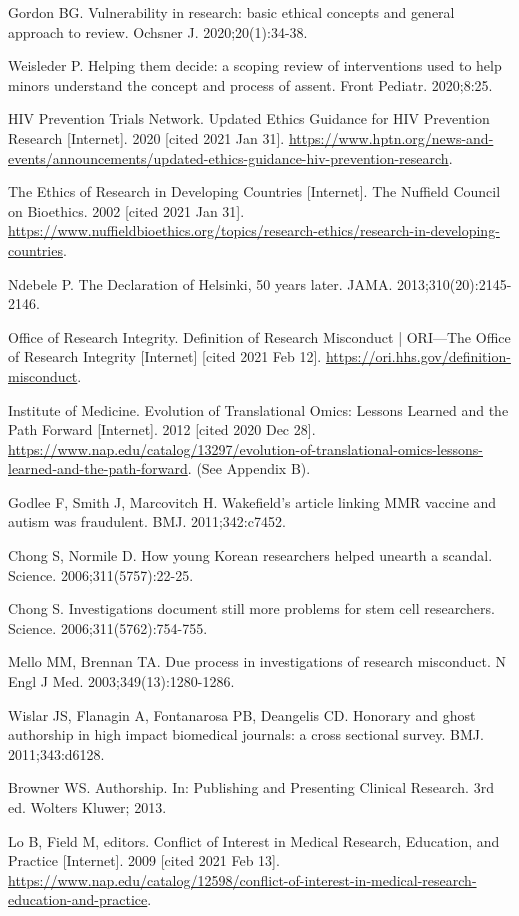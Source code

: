 \begin{references}
\item Gordon BG. Vulnerability in research: basic ethical concepts and general approach to review. Ochsner J. 2020;20(1):34-38.
\item Weisleder P. Helping them decide: a scoping review of interventions used to help minors understand the concept and process of assent. Front Pediatr. 2020;8:25.
\item HIV Prevention Trials Network. Updated Ethics Guidance for HIV Prevention Research [Internet]. 2020 [cited 2021 Jan 31]. \url{https://www.hptn.org/news-and-events/announcements/updated-ethics-guidance-hiv-prevention-research}.
\item The Ethics of Research in Developing Countries [Internet]. The Nuffield Council on Bioethics. 2002 [cited 2021 Jan 31]. \url{https://www.nuffieldbioethics.org/topics/research-ethics/research-in-developing-countries}.
\item Ndebele P. The Declaration of Helsinki, 50 years later. JAMA. 2013;310(20):2145-2146.
\item Office of Research Integrity. Definition of Research Misconduct | ORI—The Office of Research Integrity [Internet] [cited 2021 Feb 12]. \url{https://ori.hhs.gov/definition-misconduct}.
\item Institute of Medicine. Evolution of Translational Omics: Lessons Learned and the Path Forward [Internet]. 2012 [cited 2020 Dec 28]. \url{https://www.nap.edu/catalog/13297/evolution-of-translational-omics-lessons-learned-and-the-path-forward}. (See Appendix B).
\item Godlee F, Smith J, Marcovitch H. Wakefield’s article linking MMR vaccine and autism was fraudulent. BMJ. 2011;342:c7452.
\item Chong S, Normile D. How young Korean researchers helped unearth a scandal. Science. 2006;311(5757):22-25.
\item Chong S. Investigations document still more problems for stem cell researchers. Science. 2006;311(5762):754-755.
\item Mello MM, Brennan TA. Due process in investigations of research misconduct. N Engl J Med. 2003;349(13):1280-1286.
\item Wislar JS, Flanagin A, Fontanarosa PB, Deangelis CD. Honorary and ghost authorship in high impact biomedical journals: a cross sectional survey. BMJ. 2011;343:d6128.
\item Browner WS. Authorship. In: Publishing and Presenting Clinical Research. 3rd ed. Wolters Kluwer; 2013.
\item Lo B, Field M, editors. Conflict of Interest in Medical Research, Education, and Practice [Internet]. 2009 [cited 2021 Feb 13]. \url{https://www.nap.edu/catalog/12598/conflict-of-interest-in-medical-research-education-and-practice}.

\end{references}
